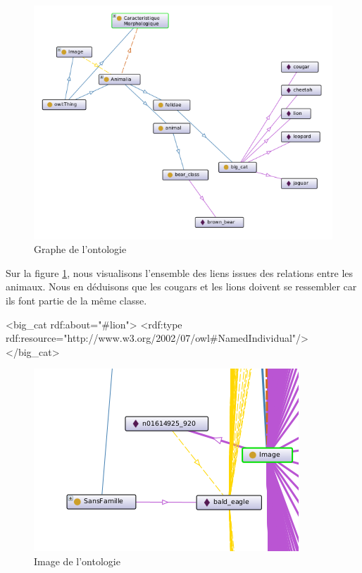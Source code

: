 \begin{figure}[!h]
    \begin{center}
        \includegraphics[scale=0.42]{./ressources/graphe2.png}
        \caption{Graphe de l'ontologie \label{fig:graphe}}
    \end{center}
\end{figure}

Sur la figure \ref{fig:graphe}, nous visualisons l'ensemble des liens issues des relations entre les animaux. 
Nous en déduisons que les cougars et les lions doivent se ressembler car ils font partie de la même classe.


\begin{paddingTab}
    \begin{customFrameXML}
    <big_cat rdf:about="#lion">
      <rdf:type rdf:resource="http://www.w3.org/2002/07/owl#NamedIndividual"/>
    </big_cat>
    \end{customFrameXML}
\end{paddingTab}


\begin{figure}[!h]
    \begin{center}
        \includegraphics[scale=0.55]{./ressources/image.png}
        \caption{Image de l'ontologie \label{fig:image}}
    \end{center}
\end{figure}

